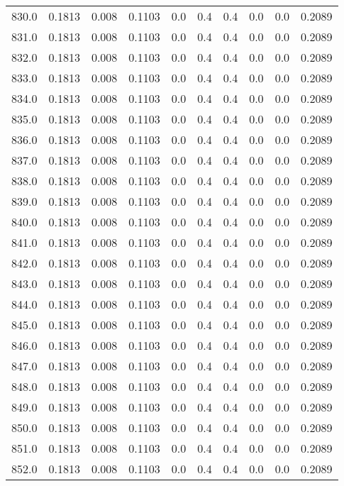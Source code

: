 \begin{longtable}{lrrrrrrrrr}
830.0 & 0.1813 & 0.008 & 0.1103 & 0.0 & 0.4 & 0.4 & 0.0 & 0.0 & 0.2089 \\
831.0 & 0.1813 & 0.008 & 0.1103 & 0.0 & 0.4 & 0.4 & 0.0 & 0.0 & 0.2089 \\
832.0 & 0.1813 & 0.008 & 0.1103 & 0.0 & 0.4 & 0.4 & 0.0 & 0.0 & 0.2089 \\
833.0 & 0.1813 & 0.008 & 0.1103 & 0.0 & 0.4 & 0.4 & 0.0 & 0.0 & 0.2089 \\
834.0 & 0.1813 & 0.008 & 0.1103 & 0.0 & 0.4 & 0.4 & 0.0 & 0.0 & 0.2089 \\
835.0 & 0.1813 & 0.008 & 0.1103 & 0.0 & 0.4 & 0.4 & 0.0 & 0.0 & 0.2089 \\
836.0 & 0.1813 & 0.008 & 0.1103 & 0.0 & 0.4 & 0.4 & 0.0 & 0.0 & 0.2089 \\
837.0 & 0.1813 & 0.008 & 0.1103 & 0.0 & 0.4 & 0.4 & 0.0 & 0.0 & 0.2089 \\
838.0 & 0.1813 & 0.008 & 0.1103 & 0.0 & 0.4 & 0.4 & 0.0 & 0.0 & 0.2089 \\
839.0 & 0.1813 & 0.008 & 0.1103 & 0.0 & 0.4 & 0.4 & 0.0 & 0.0 & 0.2089 \\
840.0 & 0.1813 & 0.008 & 0.1103 & 0.0 & 0.4 & 0.4 & 0.0 & 0.0 & 0.2089 \\
841.0 & 0.1813 & 0.008 & 0.1103 & 0.0 & 0.4 & 0.4 & 0.0 & 0.0 & 0.2089 \\
842.0 & 0.1813 & 0.008 & 0.1103 & 0.0 & 0.4 & 0.4 & 0.0 & 0.0 & 0.2089 \\
843.0 & 0.1813 & 0.008 & 0.1103 & 0.0 & 0.4 & 0.4 & 0.0 & 0.0 & 0.2089 \\
844.0 & 0.1813 & 0.008 & 0.1103 & 0.0 & 0.4 & 0.4 & 0.0 & 0.0 & 0.2089 \\
845.0 & 0.1813 & 0.008 & 0.1103 & 0.0 & 0.4 & 0.4 & 0.0 & 0.0 & 0.2089 \\
846.0 & 0.1813 & 0.008 & 0.1103 & 0.0 & 0.4 & 0.4 & 0.0 & 0.0 & 0.2089 \\
847.0 & 0.1813 & 0.008 & 0.1103 & 0.0 & 0.4 & 0.4 & 0.0 & 0.0 & 0.2089 \\
848.0 & 0.1813 & 0.008 & 0.1103 & 0.0 & 0.4 & 0.4 & 0.0 & 0.0 & 0.2089 \\
849.0 & 0.1813 & 0.008 & 0.1103 & 0.0 & 0.4 & 0.4 & 0.0 & 0.0 & 0.2089 \\
850.0 & 0.1813 & 0.008 & 0.1103 & 0.0 & 0.4 & 0.4 & 0.0 & 0.0 & 0.2089 \\
851.0 & 0.1813 & 0.008 & 0.1103 & 0.0 & 0.4 & 0.4 & 0.0 & 0.0 & 0.2089 \\
852.0 & 0.1813 & 0.008 & 0.1103 & 0.0 & 0.4 & 0.4 & 0.0 & 0.0 & 0.2089 \\

\end{longtable}
